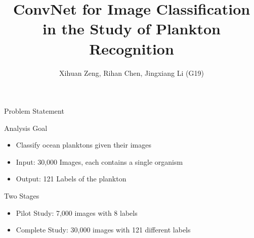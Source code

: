 \documentclass[mathserif]{beamer}
\title[ConvNet for Image Classification]{ConvNet for Image Classification\\in the Study of Plankton Recognition}
\author{Xihuan Zeng, Rihan Chen, Jingxiang Li (G19)}
\institute{School of Statistics, UMN}
\date
\begin{document}
\begin{frame}
  \titlepage
\end{frame}


\begin{frame}{Problem Statement}
\begin{block}{Analysis Goal}
\begin{itemize}
  \item Classify ocean planktons given their images
  \item Input: 30,000 Images, each contains a single organism
  \item Output: 121 Labels of the plankton
\end{itemize}
\end{block}

\begin{block}{Two Stages}
\begin{itemize}
  \item Pilot Study: 7,000 images with 8 labels
  \item Complete Study: 30,000 images with 121 different labels
\end{itemize}
\end{block}


\end{frame}
\end{document}
